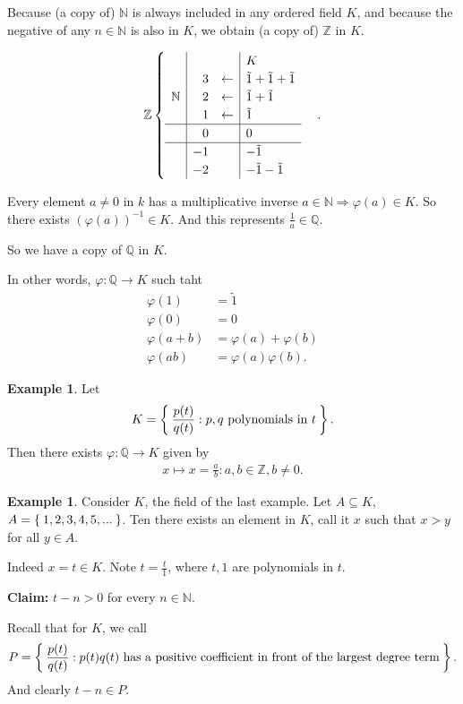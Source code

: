\documentclass[12pt]{amsbook}
\theoremstyle{plain}
\numberwithin{section}{chapter}
\numberwithin{equation}{chapter}
\theoremstyle{definition}
\newtheorem{Ex}[theorem]{Example}
\theoremstyle{remark}
\theoremstyle{plain}
\newcommand{\sub}{\subseteq}
\newcommand{\z}{\mathbb{Z}}
\newcommand{\n}{\mathbb{N}}
\newcommand{\Q}{\mathbb{Q}}
\newcommand{\bee}{\begin{equation}\begin{aligned}}
\newcommand{\eee}{\end{aligned}\end{equation}}
\newcommand{\fracc}{\frac}
\renewcommand{\phi}{\varphi}
\begin{document}
Because (a copy of) $\n$ is always included in any ordered field $K$, and because the negative of any $n \in \n$ is also in $K$, we obtain (a copy of) $\z$ in $K$. 

\bee
\z
\begin{cases}
\begin{array}{c|rc|l}
&&&K\\
& 3 & \leftarrow &  \tilde{1} + \tilde{1} + \tilde{1}\\
\n & 2 & \leftarrow &  \tilde{1} + \tilde{1}\\
& 1 & \leftarrow & \tilde{1}\\
\hline
& 0 & & 0\\
\hline
& -1 & & -\tilde{1}\\
& -2 & & -\tilde{1} - \tilde{1}
\end{array}
\end{cases}.
\eee

Every element $a \neq 0$ in $k$ has a multiplicative inverse $a \in \n \Rightarrow \phi(a) \in K$. So there exists $(\phi(a))^{-1} \in K$. And this represents $\fracc{1}{a} \in \Q$. 


So we have a copy of $\Q$ in $K$. 

In other words, $\phi: \Q \to K$ such taht
\bee
\phi(1) &= \tilde{1}\\
\phi(0) &= 0\\
\phi(a + b) &= \phi(a) + \phi(b)\\
\phi(ab) &= \phi(a)\phi(b).  
\eee

\begin{Ex}
Let 
\bee
K = \Set{\fracc{p(t)}{q(t)}:p,q \text{ polynomials in }t }. 
\eee
Then there exists $\phi: \Q \to K$ given by
\bee
x \mapsto x = \fracc{a}{b}:a,b \in \z,b \neq 0.
\eee
\end{Ex}

\begin{Ex}
Consider $K$, the field of the last example. Let $A \sub K$, $A = \Set{1,2,3,4,5,...}$. Ten there exists an element in $K$, call it $x$ such that $x > y$ for all $y \in A$. 

Indeed $x = t \in K$. Note $t = \fracc{t}{1}$, where $t,1$ are polynomials in $t$. 

\textbf{Claim: }$t - n > 0$ for every $n \in \n$. 

Recall that for $K$, we call
\bee
P = \Set{\fracc{p(t)}{q(t)}: p(t)q(t) \text{ has a positive coefficient in front of the largest degree term}}. 
\eee
And clearly $t - n \in P$. 
\end{Ex}
\end{document}
